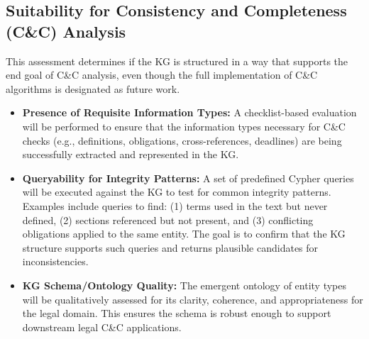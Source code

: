 \subsection{Suitability for Consistency and Completeness (C\&C) Analysis}
This assessment determines if the KG is structured in a way that supports the end goal of C\&C analysis, even though the full implementation of C\&C algorithms is designated as future work.
\begin{itemize}
    \item \textbf{Presence of Requisite Information Types:} A checklist-based evaluation will be performed to ensure that the information types necessary for C\&C checks (e.g., definitions, obligations, cross-references, deadlines) are being successfully extracted and represented in the KG.
    \item \textbf{Queryability for Integrity Patterns:} A set of predefined Cypher queries will be executed against the KG to test for common integrity patterns. Examples include queries to find: (1) terms used in the text but never defined, (2) sections referenced but not present, and (3) conflicting obligations applied to the same entity. The goal is to confirm that the KG structure supports such queries and returns plausible candidates for inconsistencies.
    \item \textbf{KG Schema/Ontology Quality:} The emergent ontology of entity types will be qualitatively assessed for its clarity, coherence, and appropriateness for the legal domain. This ensures the schema is robust enough to support downstream legal C\&C applications.
\end{itemize}

